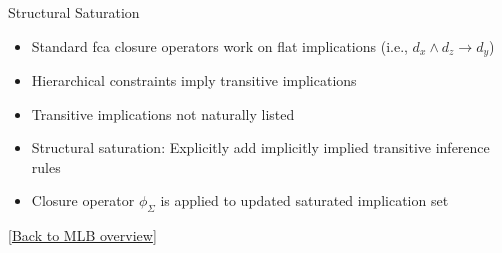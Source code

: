 \begin{frame}{Structural Saturation}
\hypertarget{appendix:saturation}{}
\begin{itemize}
    \item Standard \ac{fca} closure operators work on flat implications (i.e., $d_x \wedge d_z \rightarrow d_y$)
    \item Hierarchical constraints imply transitive implications 
    \item[\danger] Transitive implications not naturally listed
    \item[$\rightarrow$] Structural saturation: Explicitly add implicitly implied transitive inference rules
    \item Closure operator $\phi_{\Sigma}$ is applied to updated saturated implication set
\end{itemize}

\vspace{0.35em}
\begin{center}
\end{center}
\vfill
{\tiny[\hyperlink{main:mlb-constraints}{Back to MLB overview}]}
\end{frame}

